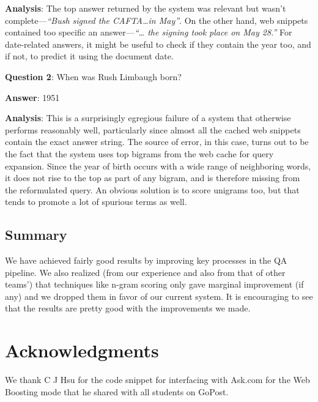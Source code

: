 \documentclass[11pt]{article}
\begin{document}
\noindent \textbf{Analysis}: The top answer returned by the system was relevant but wasn't complete---\emph{``Bush signed the CAFTA\ldots{}in May''}. On the other hand, web snippets contained too specific an answer---\emph{``\ldots{} the signing took place on May 28.''} For date-related answers, it might be useful to check if they contain the year too, and if not, to predict it using the document date.


\noindent \textbf{Question 2}: When was Rush Limbaugh born?

\noindent \textbf{Answer}: 1951

\noindent \textbf{Analysis}:
This is a surprisingly egregious failure of a system that otherwise performs reasonably well, particularly since almost all the cached web snippets contain the exact answer string. The source of error, in this case, turns out to be the fact that the system uses top bigrams from the web cache for query expansion. Since the year of birth occurs with a wide range of neighboring words, it does not rise to the top as part of any bigram, and is therefore missing from the reformulated query. An obvious solution is to score unigrams too, but that tends to promote a lot of spurious terms as well.

\subsection{Summary}
We have achieved fairly good results by improving key processes in the QA pipeline. We also realized (from our experience and also from that of other teams') that techniques like n-gram scoring only gave marginal improvement (if any) and we dropped them in favor of our current system. It is encouraging to see that the results are pretty good with the improvements we made.

\section*{Acknowledgments}
We thank C J Hsu for the code snippet for interfacing with Ask.com for the Web Boosting mode that he shared with all students on GoPost.

\printbibliography
\end{document}

